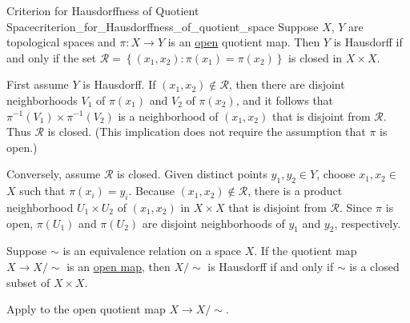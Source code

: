 \documentclass{report}
\begin{document}
\begin{proposition}{Criterion for Hausdorffness of Quotient Space}{criterion_for_Hausdorffness_of_quotient_space}
	Suppose $X$, $Y$ are topological spaces and $\pi: X \rightarrow Y$ is an \hyperref[th:open_map]{open} quotient map. Then $Y$ is Hausdorff if and only if the set $\mathcal{R}=\left\{\left(x_1, x_2\right): \pi\left(x_1\right)=\pi\left(x_2\right)\right\}$ is closed in $X \times X$.
\end{proposition}

\begin{prf}
	First assume $Y$ is Hausdorff. If $\left(x_1, x_2\right) \notin \mathcal{R}$, then there are disjoint neighborhoods $V_1$ of $\pi\left(x_1\right)$ and $V_2$ of $\pi\left(x_2\right)$, and it follows that $\pi^{-1}\left(V_1\right) \times \pi^{-1}\left(V_2\right)$ is a neighborhood of $\left(x_1, x_2\right)$ that is disjoint from $\mathcal{R}$. Thus $\mathcal{R}$ is closed. (This implication does not require the assumption that $\pi$ is open.)

	Conversely, assume $\mathcal{R}$ is closed. Given distinct points $y_1, y_2 \in Y$, choose $x_1, x_2 \in$ $X$ such that $\pi\left(x_i\right)=y_i$. Because $\left(x_1, x_2\right) \notin \mathcal{R}$, there is a product neighborhood $U_1 \times U_2$ of $\left(x_1, x_2\right)$ in $X \times X$ that is disjoint from $\mathcal{R}$. Since $\pi$ is open, $\pi\left(U_1\right)$ and $\pi\left(U_2\right)$ are disjoint neighborhoods of $y_1$ and $y_2$, respectively.
\end{prf}

\begin{corollary}{}{}
	Suppose $\sim$ is an equivalence relation on a space $X$. If the quotient map $X \rightarrow X / \sim$ is an \hyperref[th:open_map]{open map}, then $X / \sim$ is Hausdorff if and only if $\sim$ is a closed subset of $X \times X$.
\end{corollary}
\begin{prf}
	Apply  to the open quotient map $X \rightarrow X / \sim$.
\end{prf}
\end{document}
